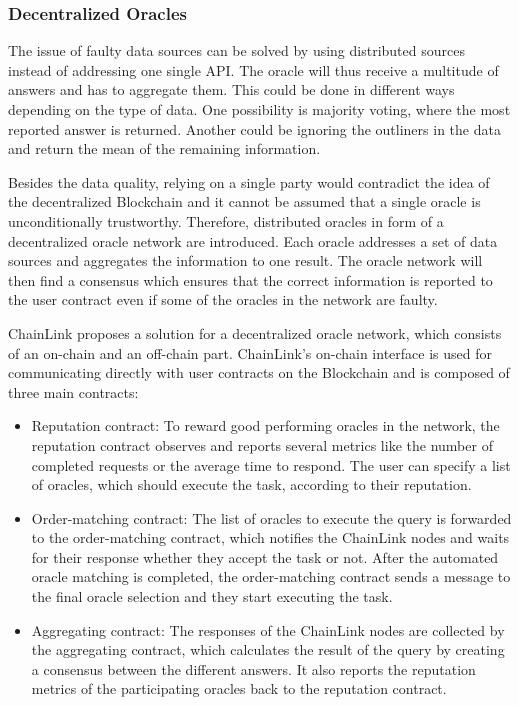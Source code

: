 \documentclass[conference]{IEEEtran}
\begin{document}
\subsubsection{Decentralized Oracles}
The issue of faulty data sources can be solved by using distributed sources instead of addressing one single API. The oracle will thus receive a multitude of answers and has to aggregate them. This could be done in different ways depending on the type of data. One possibility is majority voting, where the most reported answer is returned. Another could be ignoring the outliners in the data and return the mean of the remaining information. \cite{Mik2017} \cite{Ellis2017} \par 
Besides the data quality, relying on a single party would contradict the idea of the decentralized Blockchain and it cannot be assumed that a single oracle is unconditionally trustworthy. Therefore, distributed oracles in form of a decentralized oracle network are introduced. Each oracle addresses a set of data sources and aggregates the information to one result. The oracle network will then find a consensus which ensures that the correct information is reported to the user contract even if some of the oracles in the network are faulty. \cite{Ellis2017} \par 
ChainLink proposes a solution for a decentralized oracle network, which consists of an on-chain and an off-chain part. ChainLink's on-chain interface is used for communicating directly with user contracts on the Blockchain and is composed of three main contracts:
\begin{itemize}
	\item Reputation contract: To reward good performing oracles in the network, the reputation contract observes and reports several metrics like the number of completed requests or the average time to respond. The user can specify a list of oracles, which should execute the task, according to their reputation.
	\item Order-matching contract: The list of oracles to execute the query is forwarded to the order-matching contract, which notifies the ChainLink nodes and waits for their response whether they accept the task or not. After the automated oracle matching is completed, the order-matching contract sends a message to the final oracle selection and they start executing the task.
	\item Aggregating contract: The responses of the ChainLink nodes are collected by the aggregating contract, which calculates the result of the query by creating a consensus between the different answers. It also reports the reputation metrics of the participating oracles back to the reputation contract. \cite{Ellis2017}   
\end{itemize}
\end{document}
